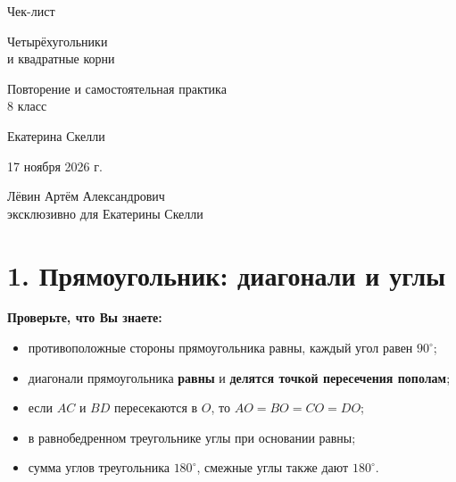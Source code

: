 \documentclass[a4paper,11pt]{article}
\newcommand{\sect}[1]{\vspace{7pt}\section*{\color{darkaccent}#1}\vspace{-5pt}\noindent{\color{accent}\rule{\linewidth}{0.45pt}}\vspace{3pt}}
\begin{document}
\thispagestyle{empty}
\begin{titlepage}
  \centering
  \vspace*{23mm}
  {\Large\color{darkaccent}\par}
  \vspace{25mm}
  {\Huge Чек-лист\par}
  \vspace{12mm}
  {\LARGE\color{accent}Четырёхугольники\\[3mm]и квадратные корни\par}
  \vspace{21mm}
  {\large Повторение и самостоятельная практика\\[2mm]8 класс\par}
  \vfill
  {\Large Екатерина Скелли\par}
  \vspace{13mm}
  {\large 17 ноября 2026 г.\par}
  \vspace{18mm}
  {\normalsize Лёвин Артём Александрович\\[1mm]эксклюзивно для Екатерины Скелли\par}
  \vspace{18mm}
  \vspace{9mm}
\end{titlepage}

\sect{1. Прямоугольник: диагонали и углы}
\textbf{Проверьте, что Вы знаете:}
\begin{itemize}
\item противоположные стороны прямоугольника равны, каждый угол равен $90^\circ$;
\item диагонали прямоугольника \textbf{равны} и \textbf{делятся точкой пересечения пополам};
\item если $AC$ и $BD$ пересекаются в $O$, то $AO=BO=CO=DO$;
\item в равнобедренном треугольнике углы при основании равны;
\item сумма углов треугольника $180^\circ$, смежные углы также дают $180^\circ$.
\end{itemize}
\end{document}
